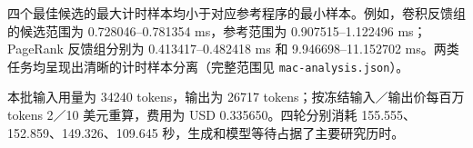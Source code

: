 四个最佳候选的最大计时样本均小于对应参考程序的最小样本。例如，卷积反馈组的候选范围为 0.728046--0.781354 ms，参考范围为 0.907515--1.122496 ms；PageRank 反馈组分别为 0.413417--0.482418 ms 和 9.946698--11.152702 ms。两类任务均呈现出清晰的计时样本分离（完整范围见 \texttt{mac-analysis.json}）。

本批输入用量为 34240 tokens，输出为 26717 tokens；按冻结输入／输出价每百万 tokens 2／10 美元重算，费用为 USD 0.335650。四轮分别消耗 155.555、152.859、149.326、109.645 秒，生成和模型等待占据了主要研究历时。

